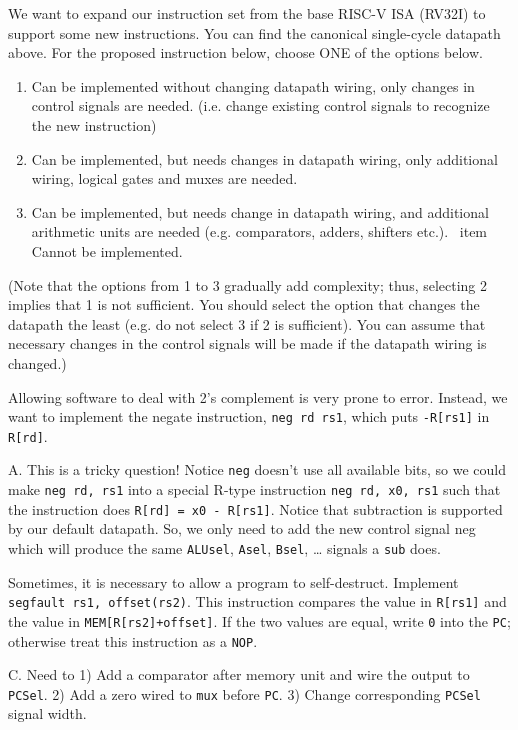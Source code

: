 \begin{blocksection}
\question
We want to expand our instruction set from the base RISC-­V ISA (RV32I) to support some new instructions. You can find the canonical single-cycle datapath above. For the proposed instruction below, choose ONE of the options below.

\begin{enumerate}
    \item Can be implemented without changing datapath wiring, only changes in control signals are needed. (i.e. change existing control signals to recognize the new instruction)
    \item Can be implemented, but needs changes in datapath wiring, only additional wiring, logical gates and muxes are needed.
    \item Can be implemented, but needs change in datapath wiring, and additional arithmetic units are needed (e.g. comparators, adders, shifters etc.).
    \ item Cannot be implemented.
\end{enumerate}

(Note that the options from 1 to 3 gradually add complexity; thus, selecting 2 implies that 1 is not sufficient. You should select the option that changes the datapath the least (e.g. do not select 3 if 2 is sufficient). You can assume that necessary changes in the control signals will be made if the datapath wiring is changed.)

\begin{parts}

\item Allowing software to deal with 2’s complement is very prone to error. Instead, we want to implement the negate instruction, \texttt{neg rd rs1}, which puts \texttt{-R[rs1]} in \texttt{R[rd]}.

\begin{solution}[0.5in]
A. This is a tricky question! Notice \texttt{neg} doesn’t use all available bits, so we could make \texttt{neg rd, rs1} into a special R-type instruction \texttt{neg rd, x0, rs1} such that the instruction does \texttt{R[rd] = x0 - R[rs1]}. Notice that subtraction is supported by our default datapath. So, we only need to add the new control signal neg which will produce the same \texttt{ALUsel}, \texttt{Asel}, \texttt{Bsel}, … signals a \texttt{sub} does.
\end{solution}

\item Sometimes, it is necessary to allow a program to self­-destruct. Implement \texttt{segfault rs1, offset(rs2)}. This instruction compares the value in \texttt{R[rs1]} and the value in \texttt{MEM[R[rs2]+offset]}. If the two values are equal, write \texttt{0} into the \texttt{PC}; otherwise treat this instruction as a \texttt{NOP}.

\begin{solution}[0.5in]
 C. Need to 1) Add a comparator after memory unit and wire the output to \texttt{PCSel}. 2) Add a zero wired to \texttt{mux} before \texttt{PC}. 3) Change corresponding \texttt{PCSel} signal width.
\end{solution}
\end{parts}

\end{blocksection}